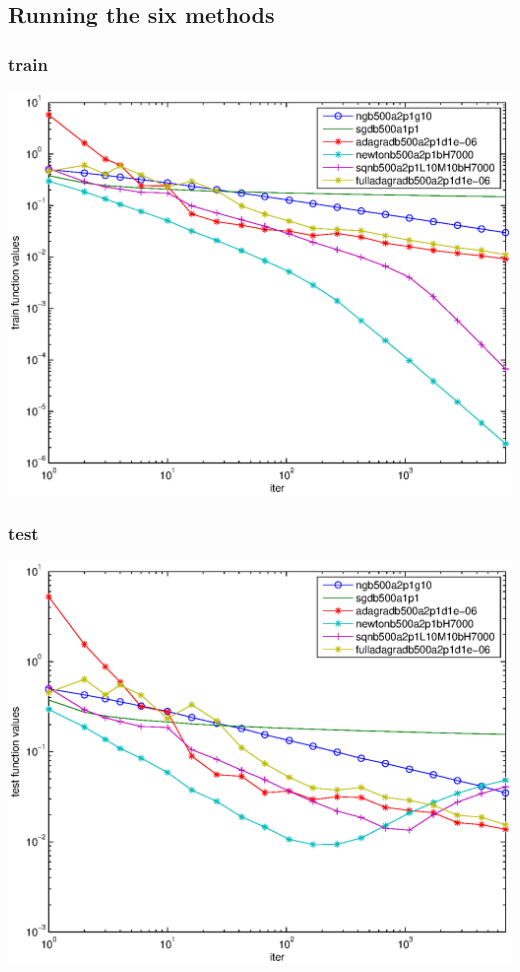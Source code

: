\documentclass[12pt]{article}
\begin{document}
\subsection{Running the six methods}

\subsubsection{train}
\includegraphics[scale=1]{paperOnImpFigures/yoram-train-6.eps}
\subsubsection{test}
\includegraphics[scale=1]{paperOnImpFigures/yoram-test-6.eps}
\end{document}
